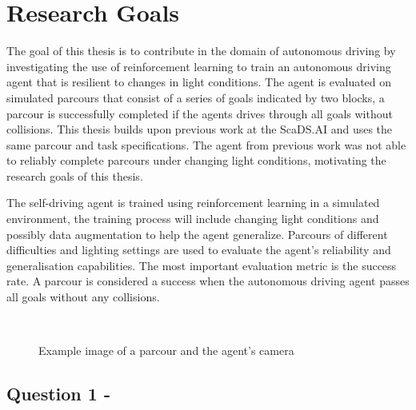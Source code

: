 \chapter{Research Goals}
\label{cha:ResearchGoals}

The goal of this thesis is to contribute in the domain of autonomous driving by investigating the use of reinforcement learning to train an autonomous driving agent that is resilient to changes in light conditions. The agent is evaluated on  simulated parcours that consist of a series of goals indicated by two blocks, a parcour is successfully completed if the agents drives through all goals without collisions.
This thesis builds upon previous work at the ScaDS.AI \textcite{maximilian} and uses the same parcour and task specifications. The agent from previous work was not able to reliably complete parcours under changing light conditions, motivating the research goals of this thesis.


The self-driving agent is trained using reinforcement learning in a simulated environment, the training process will include changing light conditions and possibly data augmentation to help the agent generalize.
Parcours of different difficulties and lighting settings are used to evaluate the agent's reliability and generalisation capabilities. The most important evaluation metric is the success rate. A parcour is considered a success when the autonomous driving agent passes all goals without any collisions.


\begin{figure}
    \centering
    \qquad
    \\
    \caption{Example image of a parcour and the agent's camera}
\end{figure}


\section{Question 1 - \questionOne}

